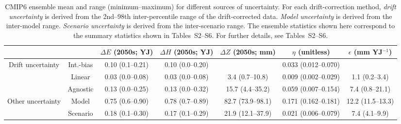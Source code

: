 \begin{table*}[t]
\centering
\caption{CMIP6 ensemble mean and range (minimum–maximum) for different sources of uncertainty. For each drift-correction method, \emph{drift uncertainty} is derived from the 2nd--98th inter-percentile range of the drift-corrected data. \emph{Model uncertainty} is derived from the inter-model range. \emph{Scenario uncertainty} is derived from the inter-scenario range. The ensemble statistics shown here correspond to the summary statistics shown in Tables~S2--S6. For further details, see Tables~S2--S6.}
\begin{tabular}{cc|c|c|c|c|c}
\toprule
 &  & $\Delta E$ (2050s; YJ) & $\Delta H$ (2050s; YJ) & $\Delta Z$ (2050s; mm) & $\eta$ (unitless) & $\epsilon$ (mm YJ$^{-1}$) \\
\midrule
\multirow[c]{3}{*}{Drift uncertainty} & Int.-bias & 0.10 (0.1–0.21) & 0.10 (0.0–0.20) &  & 0.033 (0.012–0.070) &  \\
 & Linear & 0.03 (0.0–0.08) & 0.03 (0.0–0.08) & 3.4 (0.7–10.8) & 0.009 (0.002–0.029) & 1.1 (0.2–3.4) \\
 & Agnostic & 0.13 (0.0–0.25) & 0.13 (0.0–0.32) & 15.7 (4.4–35.2) & 0.059 (0.007–0.154) & 7.4 (0.8–21.1) \\
\midrule
\multirow[c]{2}{*}{Other uncertainty} & Model & 0.75 (0.6–0.90) & 0.78 (0.7–0.89) & 82.7 (73.9–98.1) & 0.171 (0.162–0.181) & 12.2 (11.5–13.3) \\
 & Scenario & 0.18 (0.1–0.30) & 0.17 (0.1–0.29) & 21.9 (12.1–37.9) & 0.021 (0.006–0.079) & 7.4 (4.1–9.9) \\
\bottomrule
\end{tabular}
\end{table*}
